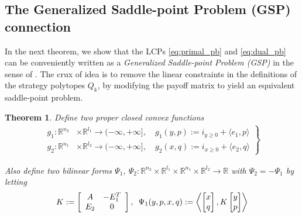 \documentclass[a4paper,9pt]{extarticle}
\newtheorem{theorem}{Theorem}
\begin{document}
\subsection{The Generalized Saddle-point Problem (GSP) connection}
In the next theorem, we show that the LCPs \eqref{eq:primal_pb}
and \eqref{eq:dual_pb} can be
conveniently written as a \textit{Generalized Saddle-point Problem
  (GSP)} in the sense of \cite{he2013accelerating}. The crux of idea
is to remove the linear constraints in the definitions of the strategy
polytopes $Q_k$, by modifying the payoff matrix to yield an equivalent
saddle-point problem.
\begin{theorem}
Define two proper closed convex functions
  \begin{eqnarray}
    \left.
    \begin{aligned}
      g_1: \mathbb{R}^{n_2} &\times \mathbb{R}^{l_1} \rightarrow
      (-\infty, +\infty], \hspace{1em} g_1(y, p) :=
        i_{y \ge 0} + \langle e_1,p\rangle\\
        g_2: \mathbb{R}^{n_1} &\times \mathbb{R}^{l_2} \rightarrow
        (-\infty, +\infty],\hspace{1em} g_2(x, q) :=
          i_{x \ge 0} + \langle e_2, q\rangle
    \end{aligned}
    \right\}
    \label{eq:things}
  \end{eqnarray}

Also define two bilinear forms $\Psi_1$, $\Psi_2: \mathbb{R}^{n_2}
\times \mathbb{R}^{l_1} \times \mathbb{R}^{n_1} \times
\mathbb{R}^{l_2} \rightarrow \mathbb{R}$ with $\Psi_2 = -\Psi_1$ by letting
\begin{equation}
  \begin{split}  
    K :=
    \left[
      \begin{array}{cc}
        A & -E_1^T \\
        E_2 & 0
      \end{array}
      \right],\hspace{.5em}
    \Psi_1(y, p, x, q)
    := \left\langle \begin{bmatrix}x\\q\end{bmatrix},
      K\begin{bmatrix}y\\p\end{bmatrix}\right\rangle%
\end{split}
\end{equation}


\end{theorem}
\end{document}
